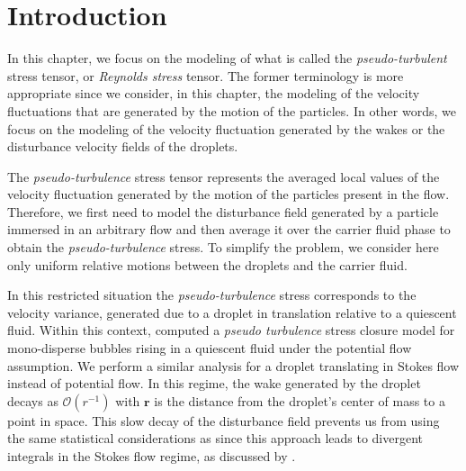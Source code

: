 
\section{Introduction}


In this chapter, we focus on the modeling of what is called the \textit{pseudo-turbulent} stress tensor, or \textit{Reynolds stress} tensor. 
The former terminology is more appropriate since we consider, in this chapter, the modeling of the velocity fluctuations that are generated by the motion of the particles. 
In other words, we focus on the modeling of the velocity fluctuation generated by the wakes or the disturbance velocity fields of the droplets. 


The \textit{pseudo-turbulence} stress tensor represents the averaged local values of the velocity fluctuation generated by the motion of the particles present in the flow. 
Therefore, we first need to model the disturbance field generated by a particle immersed in an arbitrary flow and then average it over the carrier fluid phase to obtain the \textit{pseudo-turbulence} stress. 
To simplify the problem, we consider here only uniform relative motions between the droplets and the carrier fluid. 

In this restricted situation the \textit{pseudo-turbulence} stress corresponds to the velocity variance, generated due to a droplet in translation relative to a quiescent fluid.
Within this context, \citet{biesheuvel1984two,vanvan1998pseudo,zhang1994ensemble} computed a \textit{pseudo turbulence} stress closure model for mono-disperse bubbles rising in a quiescent fluid under the potential flow assumption. 
We perform a similar analysis for a droplet translating in Stokes flow instead of potential flow. In this regime, the wake generated by the droplet decays as $\mathcal{O}(r^{-1})$ with $\textbf{r}$ is the distance from the droplet's center of mass to a point in space. 
This slow decay of the disturbance field prevents us from using the same statistical considerations as \citet{van1998pseudo}  since this approach leads to divergent integrals in the Stokes flow regime, as discussed by \citet{caflisch1985variance}. 


